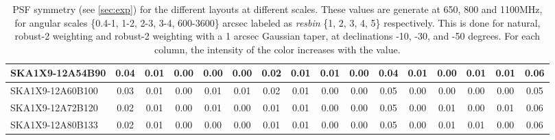 \begin{table}[H]
{{\begin{tabular}{|lccccc||ccccc||ccccc|}
SKA1X9-12A54B90 & 0.04 \cellcolor{blue!60.00} & 0.01 \cellcolor{red!18.00} & 0.00 \cellcolor{green!18.00} & 0.00 \cellcolor{orange!18.00} & 0.00 \cellcolor{purple!18.00} & 0.02 \cellcolor{blue!39.00} & 0.01 \cellcolor{red!18.00} & 0.01 \cellcolor{green!60.00} & 0.00 \cellcolor{orange!18.00} & 0.04 \cellcolor{purple!39.00} & 0.01 \cellcolor{blue!39.00} & 0.00 \cellcolor{red!18.00} & 0.01 \cellcolor{green!60.00} & 0.01 \cellcolor{orange!60.00} & 0.06 \cellcolor{purple!32.00}\\ \hline 
SKA1X9-12A60B100 & 0.03 \cellcolor{blue!39.00} & 0.01 \cellcolor{red!18.00} & 0.00 \cellcolor{green!18.00} & 0.01 \cellcolor{orange!60.00} & 0.01 \cellcolor{purple!39.00} & 0.02 \cellcolor{blue!39.00} & 0.01 \cellcolor{red!18.00} & 0.00 \cellcolor{green!18.00} & 0.00 \cellcolor{orange!18.00} & 0.05 \cellcolor{purple!60.00} & 0.00 \cellcolor{blue!18.00} & 0.00 \cellcolor{red!18.00} & 0.00 \cellcolor{green!18.00} & 0.00 \cellcolor{orange!18.00} & 0.05 \cellcolor{purple!18.00}\\ \hline 
SKA1X9-12A72B120 & 0.02 \cellcolor{blue!18.00} & 0.01 \cellcolor{red!18.00} & 0.00 \cellcolor{green!18.00} & 0.01 \cellcolor{orange!60.00} & 0.00 \cellcolor{purple!18.00} & 0.01 \cellcolor{blue!18.00} & 0.01 \cellcolor{red!18.00} & 0.00 \cellcolor{green!18.00} & 0.00 \cellcolor{orange!18.00} & 0.05 \cellcolor{purple!60.00} & 0.00 \cellcolor{blue!18.00} & 0.01 \cellcolor{red!60.00} & 0.00 \cellcolor{green!18.00} & 0.01 \cellcolor{orange!60.00} & 0.06 \cellcolor{purple!32.00}\\ \hline 
SKA1X9-12A80B133 & 0.02 \cellcolor{blue!18.00} & 0.01 \cellcolor{red!18.00} & 0.00 \cellcolor{green!18.00} & 0.00 \cellcolor{orange!18.00} & 0.00 \cellcolor{purple!18.00} & 0.01 \cellcolor{blue!18.00} & 0.01 \cellcolor{red!18.00} & 0.00 \cellcolor{green!18.00} & 0.00 \cellcolor{orange!18.00} & 0.05 \cellcolor{purple!60.00} & 0.00 \cellcolor{blue!18.00} & 0.01 \cellcolor{red!60.00} & 0.01 \cellcolor{green!60.00} & 0.00 \cellcolor{orange!18.00} & 0.06 \cellcolor{purple!32.00}\\ \hline 
\end{tabular}}
\vspace{-0.300000cm}
\hspace{1cm} 

\vspace{.25cm}
\caption{PSF symmetry (see \autoref{sec:exp})  for the different layouts at different scales. These values are generate at 650, 800 and 1100MHz, for angular scales \{0.4-1, 1-2, 2-3, 3-4, 600-3600\} arcsec labeled as {\it resbin} \{1, 2, 3, 4, 5\} respectively. This is done for natural, robust-2 weighting and robust-2 weighting with a 1 arcsec Gaussian taper, at declinations -10, -30, and -50 degrees. For each column, the intensity of the color increases with the value.}\label{tab:psf_sym}}
 \end{table}

